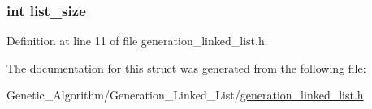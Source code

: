 \hypertarget{structgeneration__linked__list_a51695a823cbcb573d6cf50043a5adb1a}{}
\subsubsection[{list\+\_\+size}]{\setlength{\rightskip}{0pt plus 5cm}int list\+\_\+size}\label{structgeneration__linked__list_a51695a823cbcb573d6cf50043a5adb1a}


Definition at line 11 of file generation\+\_\+linked\+\_\+list.\+h.



The documentation for this struct was generated from the following file\+:\begin{DoxyCompactItemize}
\item 
Genetic\+\_\+\+Algorithm/\+Generation\+\_\+\+Linked\+\_\+\+List/\hyperlink{generation__linked__list_8h}{generation\+\_\+linked\+\_\+list.\+h}\end{DoxyCompactItemize}
